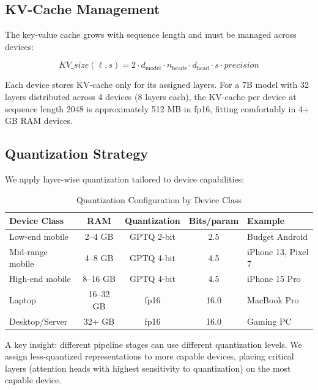\documentclass[11pt,a4paper]{article}
\begin{document}
\subsection{KV-Cache Management}

The key-value cache grows with sequence length and must be managed across devices:

\begin{equation}
    \mathit{KV\_size}(\ell, s) = 2 \cdot d_{\text{model}} \cdot n_{\text{heads}} \cdot d_{\text{head}} \cdot s \cdot \mathit{precision}
\end{equation}

Each device stores KV-cache only for its assigned layers. For a 7B model with 32 layers distributed across 4 devices (8 layers each), the KV-cache per device at sequence length 2048 is approximately 512 MB in fp16, fitting comfortably in 4+ GB RAM devices.

\subsection{Quantization Strategy}

We apply layer-wise quantization tailored to device capabilities:

\begin{table}[H]
\centering
\caption{Quantization Configuration by Device Class}
\label{tab:quantization}
\begin{tabular}{lcccl}
\toprule
\textbf{Device Class} & \textbf{RAM} & \textbf{Quantization} & \textbf{Bits/param} & \textbf{Example} \\
\midrule
Low-end mobile & 2--4 GB & GPTQ 2-bit & 2.5 & Budget Android \\
Mid-range mobile & 4--8 GB & GPTQ 4-bit & 4.5 & iPhone 13, Pixel 7 \\
High-end mobile & 8--16 GB & GPTQ 4-bit & 4.5 & iPhone 15 Pro \\
Laptop & 16--32 GB & fp16 & 16.0 & MacBook Pro \\
Desktop/Server & 32+ GB & fp16 & 16.0 & Gaming PC \\
\bottomrule
\end{tabular}
\end{table}

A key insight: different pipeline stages can use different quantization levels. We assign less-quantized representations to more capable devices, placing critical layers (attention heads with highest sensitivity to quantization) on the most capable device.
\end{document}
